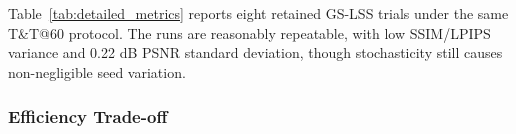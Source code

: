 \documentclass[lettersize,journal]{IEEEtran}
\begin{document}
\begin{table}[h]
\centering
\caption{Results over eight retained stochastic trials on Tanks \& Temples~\cite{tankstemples} with a 60$^\circ$ coverage gap, reporting per-trial metrics with their mean and variance.}
\label{tab:detailed_metrics}
\setlength{\tabcolsep}{4pt}
\end{table}

Table~\ref{tab:detailed_metrics} reports eight retained GS-LSS trials under the same T\&T@60 protocol. The runs are reasonably repeatable, with low SSIM/LPIPS variance and 0.22 dB PSNR standard deviation, though stochasticity still causes non-negligible seed variation.

\subsubsection{Efficiency Trade-off}
\end{document}
